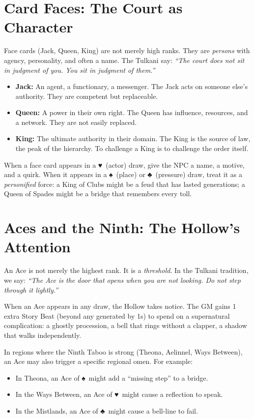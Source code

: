 \documentclass[12pt,oneside]{book}
\renewcommand{\spadesuit}{♠}
\renewcommand{\heartsuit}{♥}
\renewcommand{\clubsuit}{♣}
\begin{document}
\section*{Card Faces: The Court as Character}

Face cards (Jack, Queen, King) are not merely high ranks. They are \textit{persons} with agency, personality, and often a name. The Tulkani say: \textit{``The court does not sit in judgment of you. You sit in judgment of them.''}

\begin{itemize}
    \item \textbf{Jack:} An agent, a functionary, a messenger. The Jack acts on someone else's authority. They are competent but replaceable.
    \item \textbf{Queen:} A power in their own right. The Queen has influence, resources, and a network. They are not easily replaced.
    \item \textbf{King:} The ultimate authority in their domain. The King is the source of law, the peak of the hierarchy. To challenge a King is to challenge the order itself.
\end{itemize}

When a face card appears in a \heartsuit\ (actor) draw, give the NPC a name, a motive, and a quirk. When it appears in a \spadesuit\ (place) or \clubsuit\ (pressure) draw, treat it as a \textit{personified} force: a King of Clubs might be a feud that has lasted generations; a Queen of Spades might be a bridge that remembers every toll.

\section*{Aces and the Ninth: The Hollow's Attention}

An Ace is not merely the highest rank. It is a \textit{threshold}. In the Tulkani tradition, we say: \textit{``The Ace is the door that opens when you are not looking. Do not step through it lightly.''}

When an Ace appears in any draw, the Hollow takes notice. The GM gains 1 extra Story Beat (beyond any generated by 1s) to spend on a supernatural complication: a ghostly procession, a bell that rings without a clapper, a shadow that walks independently.

In regions where the Ninth Taboo is strong (Theona, Aelinnel, Ways Between), an Ace may also trigger a specific regional omen. For example:

\begin{itemize}
    \item In Theona, an Ace of \spadesuit\ might add a ``missing step'' to a bridge.
    \item In the Ways Between, an Ace of \heartsuit\ might cause a reflection to speak.
    \item In the Mistlands, an Ace of \clubsuit\ might cause a bell-line to fail.
\end{itemize}
\end{document}
